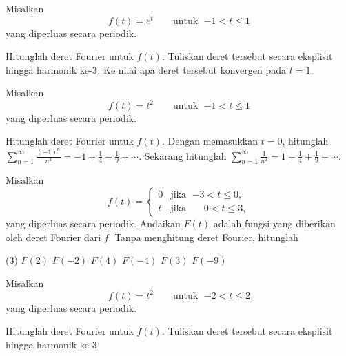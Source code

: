 \begin{exercise}
Misalkan
\begin{equation*}
f(t) = e^t \qquad \text{untuk } \; {-1} < t \leq 1
\end{equation*}
yang diperluas secara periodik.
\begin{tasks}
\task Hitunglah deret Fourier untuk $f(t)$.
\task Tuliskan deret tersebut secara eksplisit hingga harmonik ke-$3^{\text{}}$.
\task Ke nilai apa deret tersebut konvergen pada $t=1$.
\end{tasks}
\end{exercise}

\begin{exercise}
\pagebreak[2]
Misalkan
\begin{equation*}
f(t) = t^2 \qquad \text{untuk } \; {-1} < t \leq 1
\end{equation*}
yang diperluas secara periodik.
\begin{tasks}
\task Hitunglah deret Fourier untuk $f(t)$.
\task Dengan memasukkan $t=0$,
hitunglah $\displaystyle \sum_{n=1}^\infty \frac{{(-1)}^n}{n^2} = -1 + \frac{1}{4} -
\frac{1}{9} + \cdots$.
\task Sekarang hitunglah $\displaystyle \sum_{n=1}^\infty \frac{1}{n^2} = 1 + \frac{1}{4} +
\frac{1}{9} + \cdots$.
\end{tasks}
\end{exercise}

\begin{exercise}
Misalkan
\begin{equation*}
f(t) =
\begin{cases}
0 & \text{jika } \; {-3} < t \leq 0, \\
t & \text{jika } \; \phantom{-}0 < t \leq 3,
\end{cases}
\end{equation*}
yang diperluas secara periodik.  Andaikan $F(t)$ adalah fungsi yang diberikan
oleh deret Fourier dari $f$.  Tanpa menghitung deret Fourier,
hitunglah
\begin{tasks}(3)
\task $F(2)$
\task $F(-2)$
\task $F(4)$
\task $F(-4)$
\task $F(3)$
\task $F(-9)$
\end{tasks}
\end{exercise}

\setcounter{exercise}{100}

\begin{exercise}
Misalkan
\begin{equation*}
f(t) = t^2 \qquad \text{untuk } \; {-2} < t \leq 2
\end{equation*}
yang diperluas secara periodik.
\begin{tasks}
\task Hitunglah deret Fourier untuk $f(t)$.
\task Tuliskan deret tersebut secara eksplisit hingga harmonik ke-$3^{\text{}}$.
\end{tasks}
\end{exercise}

